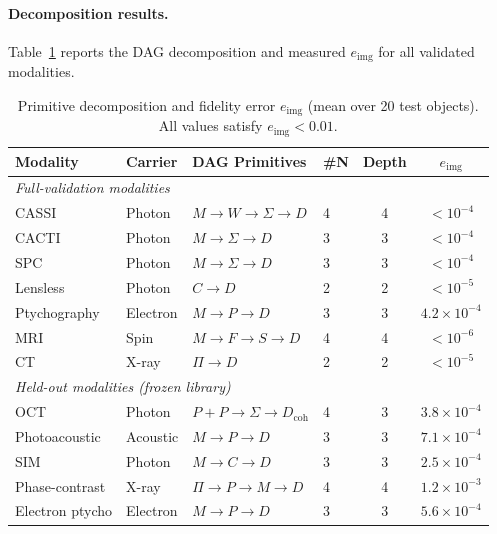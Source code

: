 \documentclass[11pt]{article}
\newcommand{\etier}{e_{\mathrm{img}}}
\begin{document}
\paragraph{Decomposition results.}
Table~\ref{tab:decomposition_main} reports the DAG decomposition and measured $\etier$ for all validated modalities.

\begin{table}[h]
\centering\small
\setlength{\tabcolsep}{5pt}
\caption{Primitive decomposition and fidelity error $\etier$ (mean over 20 test objects). All values satisfy $\etier < 0.01$.}
\label{tab:decomposition_main}
\begin{tabular}{@{}llllcc@{}}
\toprule
Modality & Carrier & DAG Primitives & \#N & Depth & $\etier$ \\
\midrule
\multicolumn{6}{l}{\textit{Full-validation modalities}} \\
CASSI         & Photon   & $M \!\to\! W \!\to\! \Sigma \!\to\! D$      & 4 & 4 & $< 10^{-4}$ \\
CACTI         & Photon   & $M \!\to\! \Sigma \!\to\! D$                & 3 & 3 & $< 10^{-4}$ \\
SPC           & Photon   & $M \!\to\! \Sigma \!\to\! D$                & 3 & 3 & $< 10^{-4}$ \\
Lensless      & Photon   & $C \!\to\! D$                               & 2 & 2 & $< 10^{-5}$ \\
Ptychography  & Electron & $M \!\to\! P \!\to\! D$                     & 3 & 3 & $4.2 \times 10^{-4}$ \\
MRI           & Spin     & $M \!\to\! F \!\to\! S \!\to\! D$           & 4 & 4 & $< 10^{-6}$ \\
CT            & X-ray    & $\Pi \!\to\! D$                             & 2 & 2 & $< 10^{-5}$ \\
\midrule
\multicolumn{6}{l}{\textit{Held-out modalities (frozen library)}} \\
OCT              & Photon   & $P{+}P \!\to\! \Sigma \!\to\! D_{\mathrm{coh}}$ & 4 & 3 & $3.8 \times 10^{-4}$ \\
Photoacoustic    & Acoustic & $M \!\to\! P \!\to\! D$                   & 3 & 3 & $7.1 \times 10^{-4}$ \\
SIM              & Photon   & $M \!\to\! C \!\to\! D$                   & 3 & 3 & $2.5 \times 10^{-4}$ \\
Phase-contrast   & X-ray    & $\Pi \!\to\! P \!\to\! M \!\to\! D$      & 4 & 4 & $1.2 \times 10^{-3}$ \\
Electron ptycho  & Electron & $M \!\to\! P \!\to\! D$                   & 3 & 3 & $5.6 \times 10^{-4}$ \\

\end{tabular}
\end{table}
\end{document}
